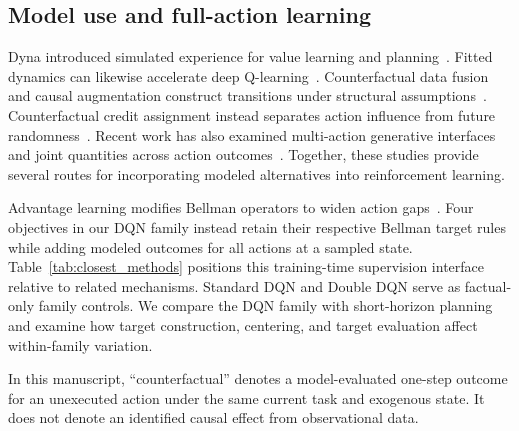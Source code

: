 \documentclass[remotesensing,article,submit,moreauthors]{Definitions/mdpi}
\begin{document}
\subsection{Model use and full-action learning}

Dyna introduced simulated experience for value learning and planning~\cite{sutton1991dyna}. Fitted dynamics can likewise accelerate deep Q-learning~\cite{gu2016continuous}. Counterfactual data fusion and causal augmentation construct transitions under structural assumptions~\cite{forney2017counterfactual,armengol2024caiac}. Counterfactual credit assignment instead separates action influence from future randomness~\cite{mesnard2021counterfactual}. Recent work has also examined multi-action generative interfaces and joint quantities across action outcomes~\cite{kaya2026joint}. Together, these studies provide several routes for incorporating modeled alternatives into reinforcement learning.

Advantage learning modifies Bellman operators to widen action gaps~\cite{bellemare2016gap}. Four objectives in our DQN family instead retain their respective Bellman target rules while adding modeled outcomes for all actions at a sampled state. Table~\ref{tab:closest_methods} positions this training-time supervision interface relative to related mechanisms. Standard DQN and Double DQN serve as factual-only family controls. We compare the DQN family with short-horizon planning and examine how target construction, centering, and target evaluation affect within-family variation.

In this manuscript, ``counterfactual'' denotes a model-evaluated one-step outcome for an unexecuted action under the same current task and exogenous state. It does not denote an identified causal effect from observational data.
\end{document}
